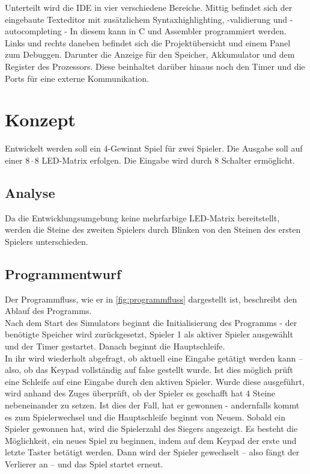Unterteilt wird die IDE in vier verschiedene Bereiche. Mittig befindet sich der eingebaute Texteditor mit zusätzlichem Syntaxhighlighting, -validierung und -autocompleting - In diesem kann in C und Assembler programmiert werden. Links und rechts daneben befindet sich die Projektübersicht und einem Panel zum Debuggen. Darunter die Anzeige für den Speicher, Akkumulator und dem Register des Prozessors. Diese beinhaltet darüber hinaus noch den Timer und die Ports für eine externe Kommunikation.
\FloatBarrier
\chapter{Konzept}

Entwickelt werden soll ein 4-Gewinnt Spiel für zwei Spieler.
Die Ausgabe soll auf einer $8 \cdot 8$ LED-Matrix erfolgen.
Die Eingabe wird durch 8 Schalter ermöglicht.

\section{Analyse}

Da die Entwicklungsumgebung keine mehrfarbige LED-Matrix bereitstellt, werden die Steine des zweiten Spielers durch Blinken von den Steinen des ersten Spielers unterschieden.

\section{Programmentwurf}

Der Programmfluss, wie er in \autoref{fig:programmfluss} dargestellt ist, beschreibt den Ablauf des Programms.\\
Nach dem Start des Simulators beginnt die Initialisierung des Programms - der benötigte Speicher wird zurückgesetzt, Spieler 1 als aktiver Spieler ausgewählt und der Timer gestartet. Danach beginnt die Hauptschleife.\\
In ihr wird wiederholt abgefragt, ob aktuell eine Eingabe getätigt werden kann -- also, ob das Keypad vollständig auf false gestellt wurde.
Ist dies möglich prüft eine Schleife auf eine Eingabe durch den aktiven Spieler.
Wurde diese ausgeführt, wird anhand des Zuges überprüft, ob der Spieler es geschafft hat 4 Steine nebeneinander zu setzen.
Ist dies der Fall, hat er gewonnen - andernfalls kommt es zum Spielerwechsel und die Hauptschleife beginnt von Neuem.
Sobald ein Spieler gewonnen hat, wird die Spielerzahl des Siegers angezeigt.
Es besteht die Möglichkeit, ein neues Spiel zu beginnen, indem auf dem Keypad der erste und letzte Taster betätigt werden.
Dann wird der Spieler gewechselt -- also fängt der Verlierer an -- und das Spiel startet erneut.

